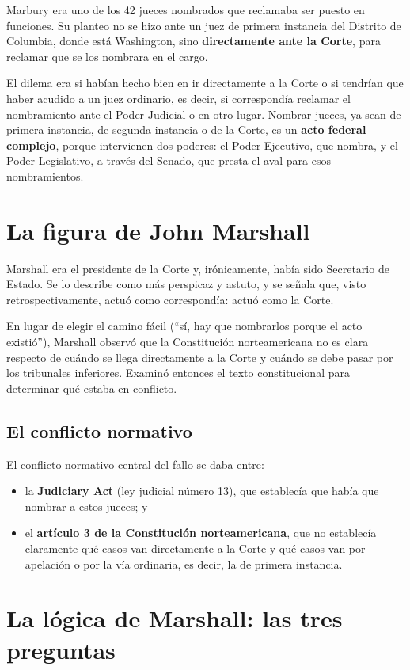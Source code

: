 \documentclass[12pt,oneside,a4paper]{book}
\begin{document}
Marbury era uno de los 42 jueces nombrados que reclamaba ser puesto en funciones. Su planteo no se hizo ante un juez de primera instancia del Distrito de Columbia, donde está Washington, sino \textbf{directamente ante la Corte}, para reclamar que se los nombrara en el cargo.

El dilema era si habían hecho bien en ir directamente a la Corte o si tendrían que haber acudido a un juez ordinario, es decir, si correspondía reclamar el nombramiento ante el Poder Judicial o en otro lugar. Nombrar jueces, ya sean de primera instancia, de segunda instancia o de la Corte, es un \textbf{acto federal complejo}, porque intervienen dos poderes: el Poder Ejecutivo, que nombra, y el Poder Legislativo, a través del Senado, que presta el aval para esos nombramientos.

\section{La figura de John Marshall}

Marshall era el presidente de la Corte y, irónicamente, había sido Secretario de Estado. Se lo describe como más perspicaz y astuto, y se señala que, visto retrospectivamente, actuó como correspondía: actuó como la Corte.

En lugar de elegir el camino fácil (``sí, hay que nombrarlos porque el acto existió''), Marshall observó que la Constitución norteamericana no es clara respecto de cuándo se llega directamente a la Corte y cuándo se debe pasar por los tribunales inferiores. Examinó entonces el texto constitucional para determinar qué estaba en conflicto.

\subsection{El conflicto normativo}

El conflicto normativo central del fallo se daba entre:
\begin{itemize}
    \item la \textbf{Judiciary Act} (ley judicial número 13), que establecía que había que nombrar a estos jueces; y
    \item el \textbf{artículo 3 de la Constitución norteamericana}, que no establecía claramente qué casos van directamente a la Corte y qué casos van por apelación o por la vía ordinaria, es decir, la de primera instancia.
\end{itemize}

\section{La lógica de Marshall: las tres preguntas}
\end{document}
